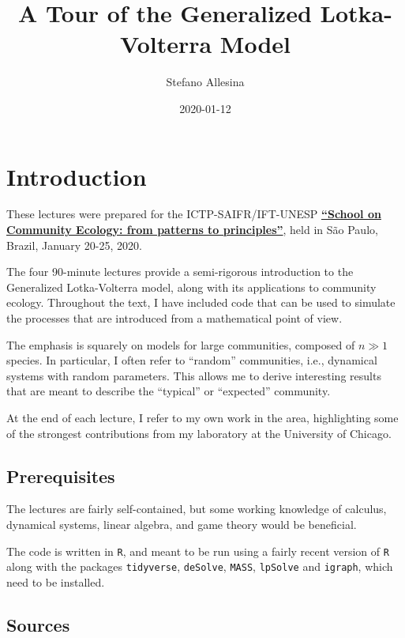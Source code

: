 \documentclass[]{book}
\title{A Tour of the Generalized Lotka-Volterra Model}
\author{Stefano Allesina}
\date{2020-01-12}
\begin{document}
\maketitle

{
\setcounter{tocdepth}{1}
\tableofcontents
}
\hypertarget{introduction}{%
\chapter{Introduction}\label{introduction}}

These lectures were prepared for the ICTP-SAIFR/IFT-UNESP \href{https://www.ictp-saifr.org/community-ecology-from-patterns-to-principles/}{\textbf{``School on Community Ecology: from patterns to principles''}}, held in São Paulo, Brazil, January 20-25, 2020.

The four 90-minute lectures provide a semi-rigorous introduction to the Generalized Lotka-Volterra model, along with its applications to community ecology. Throughout the text, I have included code that can be used to simulate the processes that are introduced from a mathematical point of view.

The emphasis is squarely on models for large communities, composed of \(n \gg 1\) species. In particular, I often refer to ``random'' communities, i.e., dynamical systems with random parameters. This allows me to derive interesting results that are meant to describe the ``typical'' or ``expected'' community.

At the end of each lecture, I refer to my own work in the area, highlighting some of the strongest contributions from my laboratory at the University of Chicago.

\hypertarget{prerequisites}{%
\section{Prerequisites}\label{prerequisites}}

The lectures are fairly self-contained, but some working knowledge of calculus, dynamical systems, linear algebra, and game theory would be beneficial.

The code is written in \texttt{R}, and meant to be run using a fairly recent version of \texttt{R} along with the packages \texttt{tidyverse}, \texttt{deSolve}, \texttt{MASS}, \texttt{lpSolve} and \texttt{igraph}, which need to be installed.

\hypertarget{sources}{%
\section{Sources}\label{sources}}
\end{document}

